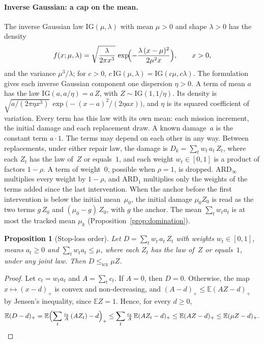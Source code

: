 \documentclass[11pt,a4paper]{article}
\theoremstyle{plain}
\newtheorem{proposition}[theorem]{Proposition}
\theoremstyle{definition}
\theoremstyle{remark}
\begin{document}
\paragraph{Inverse Gaussian: a cap on the mean.}
The inverse Gaussian law $\mathrm{IG}(\mu, \lambda)$ with mean $\mu > 0$ and shape $\lambda > 0$ has the density
\[
  f(x; \mu, \lambda) = \sqrt{\frac{\lambda}{2\pi x^3}}\,\exp\!\Bigl(-\frac{\lambda\,(x - \mu)^2}{2\mu^2 x}\Bigr), \qquad x > 0,
\]
and the variance $\mu^3/\lambda$; for $c > 0$, $c\,\mathrm{IG}(\mu, \lambda) = \mathrm{IG}(c\mu, c\lambda)$.
The formulation gives each inverse Gaussian component one dispersion $\eta > 0$.
A term of mean $a$ has the law $\mathrm{IG}(a, a/\eta) = a\,Z$, with $Z \sim \mathrm{IG}(1, 1/\eta)$.
Its density is $\sqrt{a/(2\pi\eta x^3)}\,\exp\bigl(-(x - a)^2/(2\eta a x)\bigr)$, and $\eta$ is its squared coefficient of variation.
Every term has this law with its own mean: each mission increment, the initial damage and each replacement draw.
A known damage~$a$ is the constant term $a \cdot 1$.
The terms may depend on each other in any way.
Between replacements, under either repair law, the damage is $D_k = \sum_t w_t\, a_t\, Z_t$, where each $Z_t$ has the law of~$Z$ or equals~$1$, and each weight $w_t \in [0,1]$ is a product of factors $1-\rho$.
A term of weight~$0$, possible when $\rho = 1$, is dropped.
$\text{ARD}_\infty$ multiplies every weight by $1-\rho$, and $\text{ARD}_1$ multiplies only the weights of the terms added since the last intervention.
When the anchor before the first intervention is below the initial mean~$\mu_0$, the initial damage $\mu_0 Z_0$ is read as the two terms $g\,Z_0$ and $(\mu_0 - g)\,Z_0$, with $g$ the anchor.
The mean $\sum_t w_t a_t$ is at most the tracked mean $\mu_k$ (Proposition~\ref{prop:domination}).

\begin{proposition}[Stop-loss order]\label{prop:ig_order}
Let $D = \sum_t w_t\, a_t\, Z_t$ with weights $w_t \in [0,1]$, means $a_t \ge 0$ and $\sum_t w_t a_t \le \mu$, where each $Z_t$ has the law of~$Z$ or equals~$1$, under any joint law.
Then $D \le_{\mathrm{icx}} \mu Z$.
\end{proposition}
\begin{proof}
Let $c_t = w_t a_t$ and $A = \sum_t c_t$.
If $A = 0$, then $D = 0$.
Otherwise, the map $x \mapsto (x-d)_+$ is convex and non-decreasing, and $(A - d)_+ \le \mathbb{E}(AZ - d)_+$ by Jensen's inequality, since $\mathbb{E}Z = 1$.
Hence, for every $d \ge 0$,
\[
  \mathbb{E}(D - d)_+
  = \mathbb{E}\Bigl(\sum_t \tfrac{c_t}{A}\,(A Z_t) - d\Bigr)_+
  \le \sum_t \tfrac{c_t}{A}\,\mathbb{E}(A Z_t - d)_+
  \le \mathbb{E}(A Z - d)_+
  \le \mathbb{E}(\mu Z - d)_+ . \qedhere
\]
\end{proof}
\end{document}
